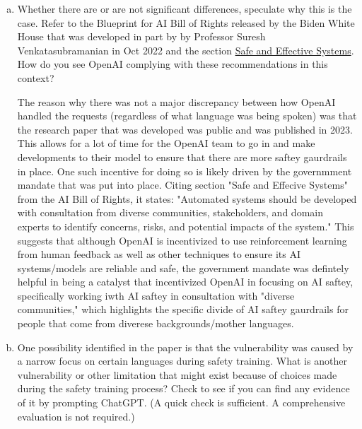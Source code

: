 \documentclass{article}
\begin{document}
\begin{enumerate}[a.]
This likely means that the OpenAI team has been working on ensuring that AI saftey specifically for saftey discrepencaies across different lagnauges is the same. 


\item Whether there are or are not significant differences, speculate why this is the case. Refer to the Blueprint for AI Bill of Rights released by the Biden White House that was developed in part by by Professor Suresh Venkatasubramanian in Oct 2022 and the section \href{https://bidenwhitehouse.archives.gov/ostp/ai-bill-of-rights/safe-and-effective-systems/}{Safe and Effective Systems}. How do you see OpenAI complying with these recommendations in this context?


The reason why there was not a major discrepancy between how OpenAI handled the requests (regardless of what language was being spoken) was that the research paper that was developed was public and was published in 2023. 
This allows for a lot of time for the OpenAI team to go in and make developments to their model to ensure that there are more saftey gaurdrails in place. 
One such incentive for doing so is likely driven by the governmment mandate that was put into place. Citing section "Safe and Effecive Systems" from the AI Bill of Rights, it states: "Automated systems should be developed with consultation from diverse communities, stakeholders, and domain experts to identify concerns, risks, and potential impacts of the system."
This suggests that although OpenAI is incentivized to use reinforcement learning from human feedback as well as other techniques to ensure its AI systems/models are reliable and safe, the government mandate was defintely helpful in being a 
catalyst that incentivized OpenAI in focusing on AI saftey, specifically working iwth AI saftey in consultation with "diverse communities," which highlights the specific divide of AI saftey gaurdrails for people that come from diverese backgrounds/mother languages. 


\item One possibility identified in the paper is that the vulnerability was caused by a narrow focus on certain languages during safety training.
What is another vulnerability or other limitation that might exist because of choices made during the safety training process? 
Check to see if you can find any evidence of it by prompting ChatGPT. (A quick check is sufficient. A comprehensive evaluation is not required.)
\end{enumerate}
\end{document}
